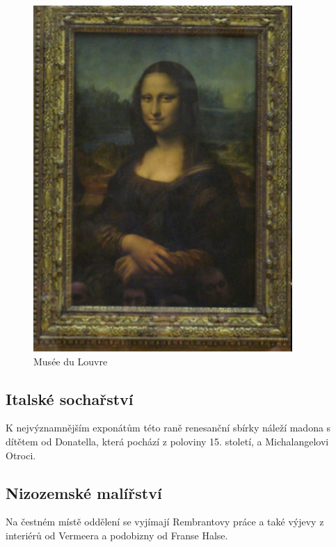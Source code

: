 \begin{figure}[h!]
\centering
\includegraphics[scale=0.5]{images/obr9M.jpg}
\caption{Musée du Louvre}
\label{lisa}
\end{figure}


\subsection{Italské sochařství}
K nejvýznamnějším exponátům této raně renesanční sbírky náleží madona s dítětem od Donatella, která pochází z poloviny 15. století, a Michalangelovi Otroci.

\subsection{Nizozemské malířství}
Na čestném místě oddělení se vyjímají Rembrantovy práce a také výjevy z interiérů od Vermeera a podobizny od Franse Halse.